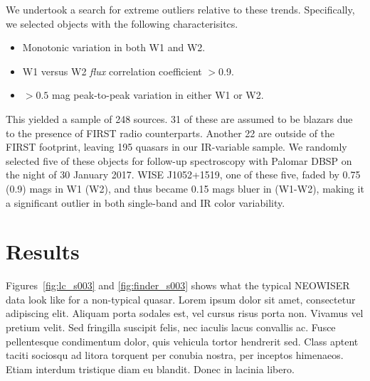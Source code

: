 \documentclass{emulateapj}
\begin{document}
We undertook a search for extreme outliers relative to these trends. 
Specifically, we selected objects with the following characterisitcs.

\begin{itemize}
\item Monotonic variation in both W1 and W2.
\item W1 versus W2 \textit{flux} correlation coefficient $>$0.9.
\item $>0.5$ mag peak-to-peak variation in either W1 or W2.
\end{itemize}


This yielded a sample of 248 sources. 31 of these are assumed to be blazars 
due to the presence of FIRST radio counterparts. Another 22 are outside of the 
FIRST  footprint, leaving 195 quasars in our IR-variable sample. We randomly 
selected five of these objects for follow-up spectroscopy with Palomar DBSP on
the night of 30 January 2017. WISE J1052+1519, one of these five, 
faded by 0.75 (0.9) mags in W1 (W2), and thus became 0.15 mags bluer in 
(W1-W2), making it a significant outlier in both single-band and IR color 
variability.



\section{Results}
Figures~\ref{fig:lc_s003} and \ref{fig:finder_s003} shows what the 
typical NEOWISER data look like for a non-typical quasar.
Lorem ipsum dolor sit amet, consectetur adipiscing elit. Aliquam porta
sodales est, vel cursus risus porta non. Vivamus vel pretium
velit. Sed fringilla suscipit felis, nec iaculis lacus convallis
ac. Fusce pellentesque condimentum dolor, quis vehicula tortor
hendrerit sed. Class aptent taciti sociosqu ad litora torquent per
conubia nostra, per inceptos himenaeos. Etiam interdum tristique diam
eu blandit. Donec in lacinia libero.
\end{document}
